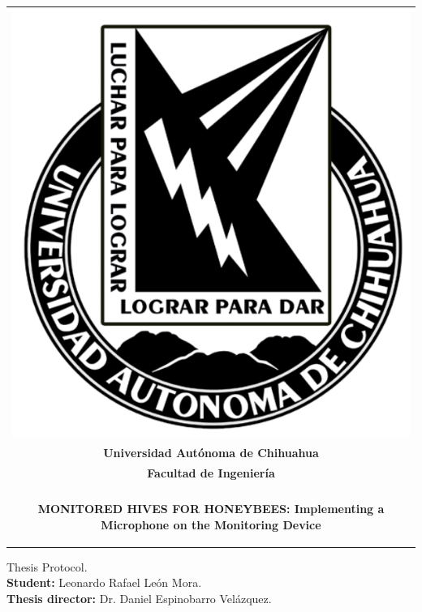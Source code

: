 \documentclass[12pt]{report}
\begin{document}
	
	\begin{titlepage}
		\begin{center}
			\begin{tabular}{c}
				\includegraphics[scale=0.2]{BN_uach.png}\\[3.5ex]
				\textbf{\LARGE Universidad Autónoma de Chihuahua}\\[3.5ex]
				\textbf{\Large Facultad de Ingeniería}\\[3.5ex]
				\hline\\[3ex]
				\begin{minipage}{17cm}
					\centering
					\begin{doublespace}
						\textbf{\LARGE MONITORED HIVES FOR HONEYBEES: Implementing a Microphone on the Monitoring Device}
					\end{doublespace}
				\end{minipage}\\[3.5ex]
				\hline
			\end{tabular}\vfill
			{\large Thesis Protocol.}\\\vfill
			{\large \textbf{Student:} Leonardo Rafael León Mora.}\\\vfill
			{\large \textbf{Thesis director:} Dr. Daniel Espinobarro Velázquez.}\\\vfill

\end{center}
\end{titlepage}
\end{document}
